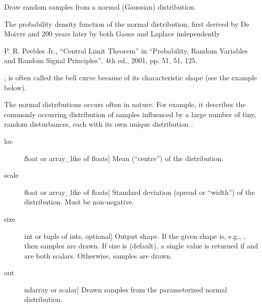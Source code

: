 \documentclass[letterpaper,10pt,english]{sphinxmanual}
\begin{document}

\begin{fulllineitems}
\label{\detokenize{time_warping:time_warping.normal}}
Draw random samples from a normal (Gaussian) distribution.

The probability density function of the normal distribution, first
derived by De Moivre and 200 years later by both Gauss and Laplace
independently %
\begin{footnote}[2]\sphinxAtStartFootnote
P. R. Peebles Jr., “Central Limit Theorem” in “Probability,
Random Variables and Random Signal Principles”, 4th ed., 2001,
pp. 51, 51, 125.
%
\end{footnote}, is often called the bell curve because of
its characteristic shape (see the example below).

The normal distributions occurs often in nature.  For example, it
describes the commonly occurring distribution of samples influenced
by a large number of tiny, random disturbances, each with its own
unique distribution \sphinxfootnotemark[2].
\begin{description}
\item[{loc}] \leavevmode{[}float or array\_like of floats{]}
Mean (“centre”) of the distribution.

\item[{scale}] \leavevmode{[}float or array\_like of floats{]}
Standard deviation (spread or “width”) of the distribution. Must be
non-negative.

\item[{size}] \leavevmode{[}int or tuple of ints, optional{]}
Output shape.  If the given shape is, e.g., , then
 samples are drawn.  If size is  (default),
a single value is returned if  and  are both scalars.
Otherwise,  samples are drawn.

\end{description}
\begin{description}
\item[{out}] \leavevmode{[}ndarray or scalar{]}
Drawn samples from the parameterized normal distribution.


\end{description}
\end{fulllineitems}
\end{document}
